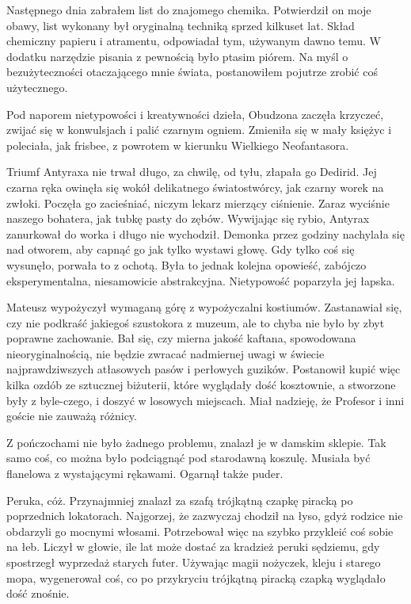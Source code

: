 Następnego dnia zabrałem list do znajomego chemika.
Potwierdził on moje obawy, list wykonany był oryginalną techniką sprzed kilkuset lat.
Skład chemiczny papieru i atramentu, odpowiadał tym, używanym dawno temu.
W dodatku narzędzie pisania z pewnością było ptasim piórem.
Na myśl o bezużyteczności otaczającego mnie świata, postanowiłem pojutrze zrobić coś użytecznego.

\divider{}

Pod naporem nietypowości i kreatywności dzieła, Obudzona zaczęła krzyczeć, zwijać się w konwulsjach i palić czarnym ogniem.
Zmieniła się w mały księżyc i poleciała, jak frisbee, z powrotem w kierunku Wielkiego Neofantasora.

Triumf Antyraxa nie trwał długo, za chwilę, od tyłu, złapała go Dedirid.
Jej czarna ręka owinęła się wokół delikatnego światostwórcy, jak czarny worek na zwłoki.
Poczęła go zacieśniać, niczym lekarz mierzący ciśnienie.
Zaraz wyciśnie naszego bohatera, jak tubkę pasty do zębów.
Wywijając się rybio, Antyrax zanurkował do worka i długo nie wychodził.
Demonka przez godziny nachylała się nad otworem, aby capnąć go jak tylko wystawi głowę.
Gdy tylko coś się wysunęło, porwała to z ochotą.
Była to jednak kolejna opowieść, zabójczo eksperymentalna, niesamowicie abstrakcyjna.
Nietypowość poparzyła jej łapska.

\divider{}

Mateusz wypożyczył wymaganą górę z wypożyczalni kostiumów.
Zastanawiał się, czy nie podkraść jakiegoś szustokora z muzeum, ale to chyba nie było by zbyt poprawne zachowanie.
Bał się, czy mierna jakość kaftana, spowodowana nieoryginalnością, nie będzie zwracać nadmiernej uwagi w świecie najprawdziwszych atłasowych pasów i perłowych guzików.
Postanowił kupić więc kilka ozdób ze sztucznej biżuterii, które wyglądały dość kosztownie, a stworzone były z
byle-czego, i doszyć w losowych miejscach. Miał nadzieję, że Profesor i inni goście nie zauważą różnicy.

Z pończochami nie było żadnego problemu, znalazł je w damskim sklepie.
Tak samo coś, co można było podciągnąć pod starodawną koszulę.
Musiała być flanelowa z wystającymi rękawami.
Ogarnął także puder.

Peruka, cóż. Przynajmniej znalazł za szafą trójkątną czapkę piracką po poprzednich lokatorach.
Najgorzej, że zazwyczaj chodził na łyso, gdyż rodzice nie obdarzyli go mocnymi włosami.
Potrzebował więc na szybko przykleić coś sobie na łeb.
Liczył w głowie, ile lat może dostać za kradzież peruki sędziemu, gdy spostrzegł wyprzedaż starych futer.
Używając magii nożyczek, kleju i starego mopa, wygenerował coś, co po przykryciu trójkątną piracką czapką wyglądało dość znośnie.


